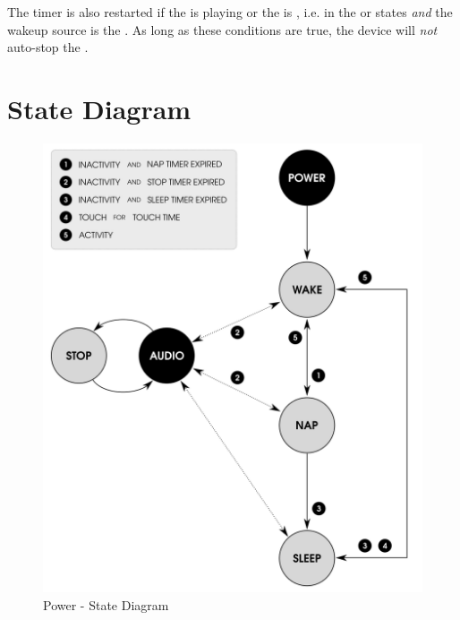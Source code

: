 \par\medskip

The timer is also restarted if the  is playing or the  is
, i.e. in the  or  states \textit{and}
the wakeup source is the .  As long as these conditions are true,
the device will \textit{not} auto-stop the .

\section{State Diagram}

\begin{figure}[H]
\centering
  \includegraphics{images/power_state_diagram.png}
\caption{Power - State Diagram}
\end{figure}
